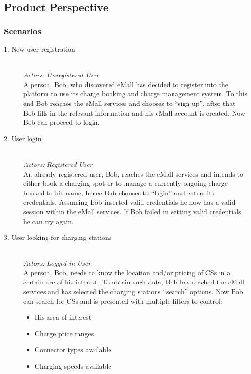 \documentclass[11pt]{article}
\begin{document}
\subsection{Product Perspective}

\subsubsection{Scenarios}
\label{subsubsec:scenarios}

\begin{description}
    \item [1. New user registration] \hfill \\
        \textit{Actors: Unregistered User} \\
        A person, Bob, who discovered eMall has decided to register into the platform to use its charge booking and charge management system. To this end Bob reaches the eMall services and chooses to “sign up”, after that Bob fills in the relevant information and his eMall account is created. Now Bob can proceed to login.
    \item [2. User login] \hfill \\
        \textit{Actors: Registered User} \\
        An already registered user, Bob, reaches the eMall services and intends to either book a charging spot or to manage a currently ongoing charge booked to his name, hence Bob chooses to “login” and enters its credentials. Assuming Bob inserted valid credentials he now has a valid session within the eMall services. If Bob failed in setting valid credentials he can try again.
    \item [3. User looking for charging stations] \hfill \\
        \label{scenario:lookingForCS}
        \textit{Actors: Logged-in User} \\
        A person, Bob, needs to know the location and/or pricing of CSs in a certain are of his interest. To obtain such data, Bob has reached the eMall services and has selected the charging stations “search” options. Now Bob can search for CSs and is presented with multiple filters to control:
        \begin{itemize}
            \item His area of interest
            \item Charge price ranges
            \item Connector types available
            \item Charging speeds available

\end{itemize}
\end{description}
\end{document}
